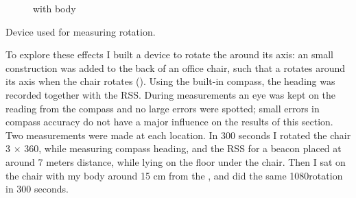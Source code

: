 {\begin{subfigure}[b]{0.45\textwidth}
        \caption{with body}
    \end{subfigure}
    \caption{Device used for measuring rotation.}
    \label{fig:rss-rot-device}
}
 

To explore these effects I built a device to rotate the \device around its axis: an small construction was added to the back of an office chair, such that a \device rotates around its axis when the chair rotates ().
Using the built-in compass, the heading was recorded together with the RSS.
During measurements an eye was kept on the reading from the compass and no large errors were spotted; small errors in compass accuracy do not have a major influence on the results of this section.
Two measurements were made at each location.
In 300 seconds I rotated the chair 3 $\times$ 360\tdegree, while measuring compass heading, and the RSS for a beacon placed at around 7 meters distance, while lying on the floor under the chair.
Then I sat on the chair with my body around 15 cm from the \device, and did the same 1080\tdegree rotation in 300 seconds.

